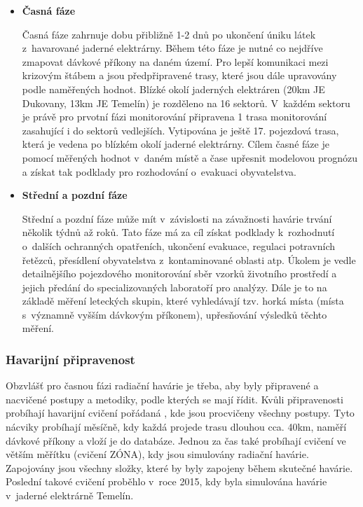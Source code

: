 \begin{itemize}
	\item \textbf{Časná fáze}
	
		Časná fáze zahrnuje dobu přibližně 1-2 dnů po ukončení úniku látek z~havarované jaderné elektrárny. Během této fáze je nutné co nejdříve zmapovat dávkové příkony na daném území. Pro lepší komunikaci mezi krizovým štábem a  jsou předpřipravené trasy, které jsou dále upravovány podle naměřených hodnot. Blízké okolí jaderných elektráren (20km JE Dukovany, 13km JE Temelín) je rozděleno na 16 sektorů. V~každém sektoru je právě pro prvotní fázi monitorování připravena 1 trasa monitorování zasahující i do sektorů vedlejších. Vytipována je ještě 17. pojezdová trasa, která je vedena po blízkém okolí jaderné elektrárny. Cílem časné fáze je pomocí měřených hodnot v~daném místě a čase upřesnit modelovou prognózu a získat tak podklady pro rozhodování o~evakuaci obyvatelstva. 

	\item \textbf{Střední a pozdní fáze}
		
		Střední a pozdní fáze může mít v~závislosti na závažnosti havárie trvání několik týdnů až roků. Tato fáze má za cíl získat podklady k~rozhodnutí o~dalších ochranných opatřeních, ukončení evakuace, regulaci potravních řetězců, přesídlení obyvatelstva z~kontaminované oblasti atp. Úkolem  je vedle detailnějšího pojezdového monitorování sběr vzorků životního prostředí a jejich předání do specializovaných laboratoří pro analýzy. Dále je to na základě měření leteckých skupin, které vyhledávají tzv. horká místa (místa s~významně vyšším dávkovým příkonem), upřesňování výsledků těchto měření. 
\end{itemize}

\subsubsection{Havarijní připravenost}

Obzvlášť pro časnou fázi radiační havárie je třeba, aby byly připravené a nacvičené postupy a metodiky, podle kterých se  mají řídit. Kvůli připravenosti probíhají havarijní cvičení pořádaná , kde jsou procvičeny všechny postupy. Tyto nácviky probíhají měsíčně, kdy každá  projede trasu dlouhou cca. 40km, naměří dávkové příkony a vloží je do databáze. Jednou za čas také probíhají cvičení ve větším měřítku (cvičení ZÓNA), kdy jsou simulovány radiační havárie. Zapojovány jsou všechny složky, které by byly zapojeny během skutečné havárie. Poslední takové cvičení proběhlo v~roce 2015, kdy byla simulována havárie v~jaderné elektrárně Temelín.

